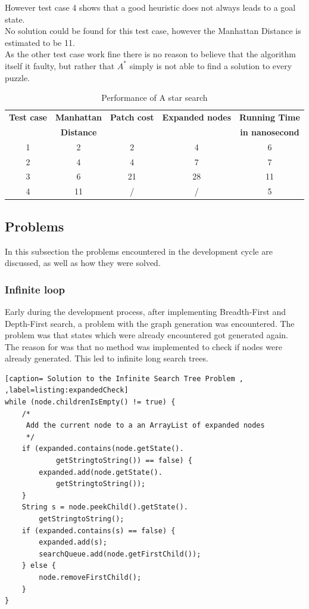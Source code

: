 \documentclass[journal]{IEEEtran}
\begin{document}
However test case 4 shows that a good heuristic does not always leads to a goal state. \\
No solution could be found for this test case, however the Manhattan Distance is estimated to be 11. \\
As the other test case work fine there is no reason to believe that the algorithm itself it faulty, but rather that $A^*$ simply is not able to find a solution to every puzzle. 


\begin{table}[h]
\renewcommand{\arraystretch}{1.3}
\centering
\caption{Performance of A star search}
\begin{tabular}{|c|c|c|c|c|}
\hline
\bfseries Test case & \bfseries Manhattan & \bfseries Patch cost & \bfseries Expanded nodes & \bfseries Running Time \\
 &\bfseries Distance & & &\bfseries in nanosecond\\\hline
1 & 2 & 2 & 4 & 6 \\
2 & 4 & 4 & 7 & 7 \\
3 & 6 & 21 & 28 & 11\\ 
4 & 11 & / & / &  5 \\\hline 
\end{tabular}
\label{tab:astar}
\end{table}

\subsection{Problems}
In this subsection the problems encountered in the development cycle are discussed, as well as how they were solved.\\

\subsubsection{Infinite loop}
Early during the development process, after implementing Breadth-First and Depth-First search, a problem with the graph generation was encountered. The problem was that states which were already encountered got generated again. \\
The reason for was that no method was implemented to check if nodes were already generated. This led to infinite long search trees.\\ 

\begin{lstlisting}[caption= Solution to the Infinite Search Tree Problem , ,label=listing:expandedCheck]
while (node.childrenIsEmpty() != true) {
	/*
	 Add the current node to a an ArrayList of expanded nodes
	 */
	if (expanded.contains(node.getState().
			getStringtoString()) == false) {
		expanded.add(node.getState().
			getStringtoString());
	}
	String s = node.peekChild().getState().
		getStringtoString();
	if (expanded.contains(s) == false) {
		expanded.add(s);
		searchQueue.add(node.getFirstChild());
	} else {
		node.removeFirstChild();
	}
}
\end{lstlisting}
\end{document}
